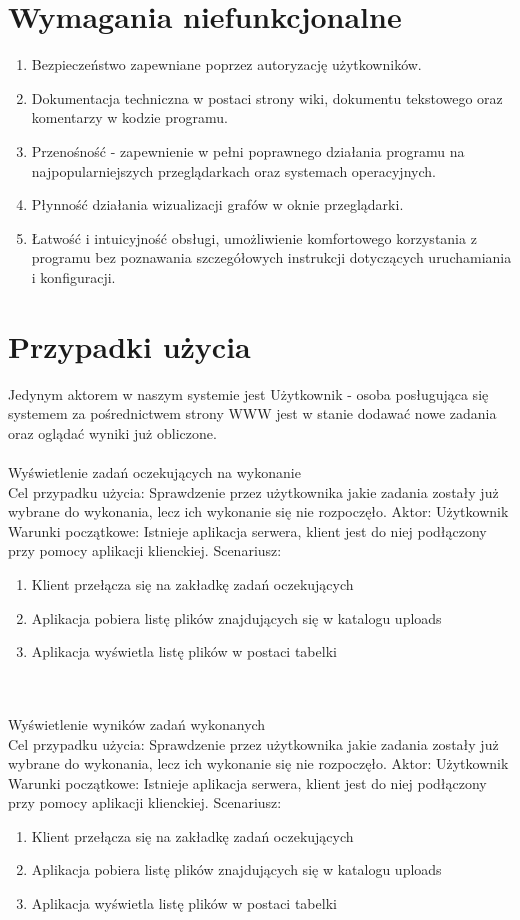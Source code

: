 \section{Wymagania niefunkcjonalne}

\begin{enumerate}
	\item Bezpieczeństwo zapewniane poprzez autoryzację użytkowników.
    \item Dokumentacja techniczna w postaci strony wiki, dokumentu tekstowego oraz komentarzy w kodzie programu.
    \item Przenośność - zapewnienie w pełni poprawnego działania programu na najpopularniejszych przeglądarkach oraz systemach operacyjnych.
    \item Płynność działania wizualizacji grafów w oknie przeglądarki.
    \item Łatwość i intuicyjność obsługi, umożliwienie komfortowego korzystania z programu bez poznawania szczegółowych instrukcji dotyczących uruchamiania i konfiguracji.
\end{enumerate}

\section{Przypadki użycia}

Jedynym aktorem w naszym systemie jest Użytkownik - osoba posługująca się systemem za pośrednictwem strony WWW jest w stanie dodawać nowe zadania oraz oglądać wyniki już obliczone.
\\\\
	Wyświetlenie zadań oczekujących na wykonanie\\
	Cel przypadku użycia: Sprawdzenie przez użytkownika jakie zadania zostały już wybrane do wykonania, lecz ich wykonanie się nie rozpoczęło. 
	Aktor: Użytkownik
	Warunki początkowe: Istnieje aplikacja serwera, klient jest do niej podłączony przy pomocy aplikacji klienckiej.
	Scenariusz:
	\begin{enumerate}
	\item Klient przełącza się na zakładkę zadań oczekujących
	\item Aplikacja pobiera listę plików znajdujących się w katalogu uploads
	\item  Aplikacja wyświetla listę plików w postaci tabelki
	\end{enumerate}
\\\\
	Wyświetlenie wyników zadań wykonanych\\
	Cel przypadku użycia: Sprawdzenie przez użytkownika jakie zadania zostały już wybrane do wykonania, lecz ich wykonanie się nie rozpoczęło. 
	Aktor: Użytkownik
	Warunki początkowe: Istnieje aplikacja serwera, klient jest do niej podłączony przy pomocy aplikacji klienckiej.
	Scenariusz:
	\begin{enumerate}
	\item Klient przełącza się na zakładkę zadań oczekujących
	\item Aplikacja pobiera listę plików znajdujących się w katalogu uploads
	\item  Aplikacja wyświetla listę plików w postaci tabelki
	\end{enumerate}

